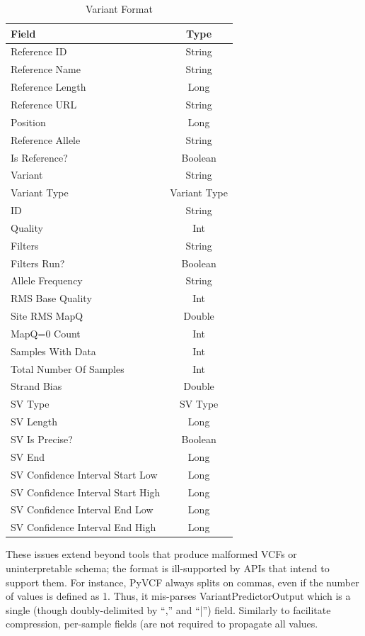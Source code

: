 \documentclass[10pt,twocolumn]{article}
\theoremstyle{plain}
\begin{document}
\begin{table}
\caption{Variant Format}
\label{tab:variant-format}
\begin{center}
\begin{tabular}{| l | c |}
\hline
\bf Field & \bf Type \\
\hline
Reference ID & String \\
Reference Name & String \\
Reference Length & Long \\
Reference URL & String \\
Position & Long \\
Reference Allele & String \\
Is Reference? & Boolean \\
Variant & String \\
Variant Type & Variant Type \\
ID & String \\
Quality & Int \\
Filters & String \\
Filters Run? & Boolean \\
Allele Frequency & String \\
RMS Base Quality & Int \\
Site RMS MapQ & Double \\
MapQ=0 Count & Int \\
Samples With Data & Int \\
Total Number Of Samples & Int \\
Strand Bias & Double \\
SV Type & SV Type \\
SV Length & Long \\
SV Is Precise? & Boolean \\
SV End & Long \\
SV Confidence Interval Start Low & Long \\ 
SV Confidence Interval Start High & Long \\
SV Confidence Interval End Low & Long \\ 
SV Confidence Interval End High & Long \\
\hline
\end{tabular}
\end{center}
\end{table}

These issues extend beyond tools that produce malformed VCFs or uninterpretable schema; the format is ill-supported by APIs that intend to
support them. For instance, PyVCF always splits on commas, even if the number of values is defined as 1. Thus, it mis-parses VariantPredictorOutput
which is a single (though doubly-delimited by ``,'' and ``|'') field. Similarly to facilitate compression, per-sample fields (are not required to propagate all values. 
\end{document}
